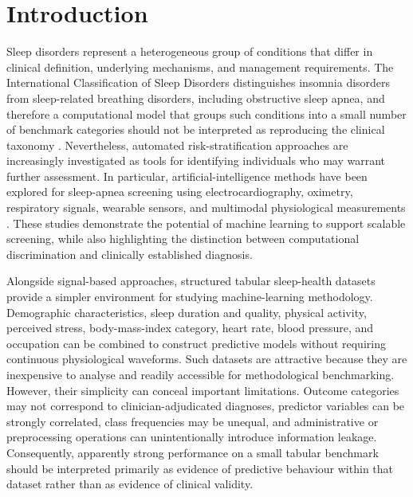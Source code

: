 \documentclass[a4paper,fleqn]{cas-dc}
\begin{document}
\maketitle
{}

\section{Introduction}

Sleep disorders represent a heterogeneous group of conditions that differ in clinical definition, underlying mechanisms, and management requirements. The International Classification of Sleep Disorders distinguishes insomnia disorders from sleep-related breathing disorders, including obstructive sleep apnea, and therefore a computational model that groups such conditions into a small number of benchmark categories should not be interpreted as reproducing the clinical taxonomy \cite{aasm2023}. Nevertheless, automated risk-stratification approaches are increasingly investigated as tools for identifying individuals who may warrant further assessment. In particular, artificial-intelligence methods have been explored for sleep-apnea screening using electrocardiography, oximetry, respiratory signals, wearable sensors, and multimodal physiological measurements \cite{bazoukis2023,tyagi2023,abdalrazaq2024,giorgi2025}. These studies demonstrate the potential of machine learning to support scalable screening, while also highlighting the distinction between computational discrimination and clinically established diagnosis.

Alongside signal-based approaches, structured tabular sleep-health datasets provide a simpler environment for studying machine-learning methodology. Demographic characteristics, sleep duration and quality, physical activity, perceived stress, body-mass-index category, heart rate, blood pressure, and occupation can be combined to construct predictive models without requiring continuous physiological waveforms. Such datasets are attractive because they are inexpensive to analyse and readily accessible for methodological benchmarking. However, their simplicity can conceal important limitations. Outcome categories may not correspond to clinician-adjudicated diagnoses, predictor variables can be strongly correlated, class frequencies may be unequal, and administrative or preprocessing operations can unintentionally introduce information leakage. Consequently, apparently strong performance on a small tabular benchmark should be interpreted primarily as evidence of predictive behaviour within that dataset rather than as evidence of clinical validity.
\end{document}
